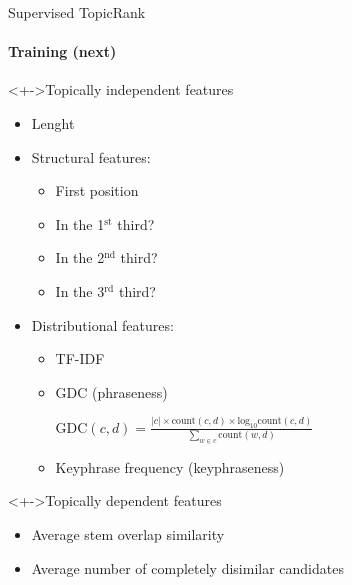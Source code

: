   \begin{frame}{Supervised TopicRank}
    \framesubtitle{Training (next)}

    \begin{block}<+->{Topically independent features}
      \begin{multicols}{2}
        \begin{itemize}
          \item<+->{Lenght}
          \item<+->{Structural features:}
          \begin{itemize}
            \item{First position}
            \item{In the 1$^{\text{st}}$ third?}
            \item{In the 2$^{\text{nd}}$ third?}
            \item{In the 3$^{\text{rd}}$ third?}
          \end{itemize}
          \item<+->{Distributional features:}
          \begin{itemize}
            \item{TF-IDF}
            \item{GDC (phraseness)\\}
            \begin{tiny}
              \hspace{-1em}$\text{GDC}(c, d) = \frac{|c| \times \text{count}(c, d) \times \text{log}_{10}\text{count}(c, d)}{\sum_{w \in c}\text{count}(w, d)}$
            \end{tiny}
            \item{Keyphrase frequency (keyphraseness)}
          \end{itemize}
        \end{itemize}
      \end{multicols}
    \end{block}

    \begin{block}<+->{Topically dependent features}
      \begin{itemize}
        \item<+->{Average stem overlap similarity}
        \item<+->{Average number of completely disimilar candidates}
      \end{itemize}
    \end{block}
  \end{frame}

